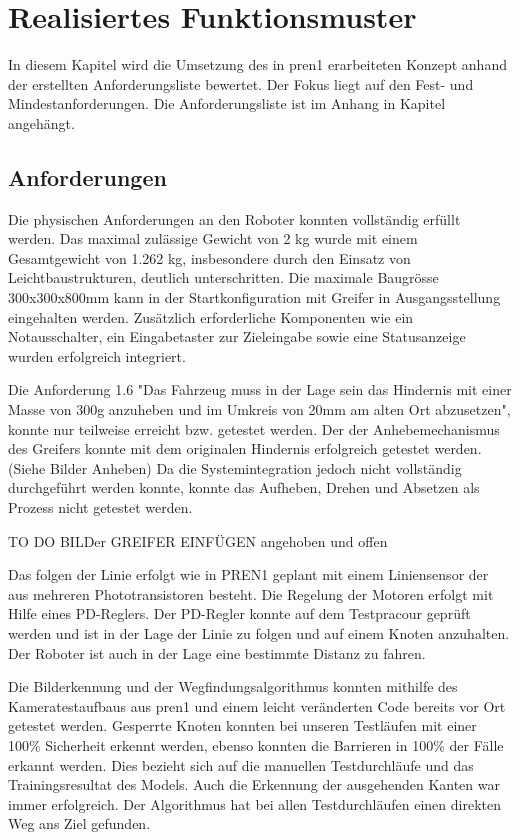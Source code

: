 \section{Realisiertes Funktionsmuster}

In diesem Kapitel wird die Umsetzung des in \acrshort{pren1} erarbeiteten Konzept anhand der  erstellten Anforderungsliste bewertet. Der Fokus liegt auf den Fest- und Mindestanforderungen. Die Anforderungsliste ist im Anhang in Kapitel  angehängt.

\subsection{Anforderungen}

Die physischen Anforderungen an den Roboter konnten vollständig erfüllt werden. Das maximal zulässige Gewicht von 2 kg wurde mit einem Gesamtgewicht von 1.262 kg, insbesondere durch den Einsatz von Leichtbaustrukturen, deutlich unterschritten. Die maximale Baugrösse 300x300x800mm kann in der Startkonfiguration mit Greifer in Ausgangsstellung eingehalten werden. Zusätzlich erforderliche Komponenten wie ein Notausschalter, ein Eingabetaster zur Zieleingabe sowie eine Statusanzeige wurden erfolgreich integriert.

Die Anforderung 1.6 "Das Fahrzeug muss in der Lage sein das Hindernis mit  einer Masse von 300g anzuheben und im Umkreis von 20mm am alten Ort abzusetzen", konnte nur teilweise erreicht bzw. getestet werden. Der der Anhebemechanismus des Greifers konnte mit dem originalen Hindernis erfolgreich getestet werden. (Siehe Bilder Anheben) Da die Systemintegration jedoch nicht vollständig durchgeführt werden konnte, konnte das Aufheben, Drehen und Absetzen als Prozess nicht getestet werden.

TO DO BILDer GREIFER EINFÜGEN angehoben und offen

Das folgen der Linie erfolgt wie in PREN1 geplant mit einem Liniensensor der aus mehreren Phototransistoren besteht. Die Regelung der Motoren erfolgt mit Hilfe eines PD-Reglers. Der PD-Regler konnte auf dem Testpracour geprüft werden und ist in der Lage der Linie zu folgen und auf einem Knoten anzuhalten. Der Roboter ist auch in der Lage eine bestimmte Distanz zu fahren.

Die Bilderkennung und der Wegfindungsalgorithmus  konnten mithilfe des Kameratestaufbaus aus \acrshort{pren1} und einem leicht veränderten Code bereits vor Ort getestet werden. Gesperrte Knoten konnten bei unseren Testläufen mit einer 100\% Sicherheit erkennt werden, ebenso konnten die Barrieren in 100\% der Fälle erkannt werden. Dies bezieht sich auf die manuellen Testdurchläufe und das Trainingsresultat des Models. Auch die Erkennung der ausgehenden Kanten war immer erfolgreich. Der Algorithmus hat bei allen Testdurchläufen einen direkten Weg ans Ziel gefunden. 

